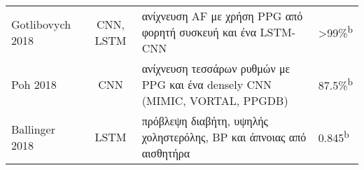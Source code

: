 \begin{sidewaystable}
\begin{tabular}{l c l l}
		Gotlibovych 2018~\cite{gotlibovych2018end}   & CNN, LSTM       & ανίχνευση AF με χρήση PPG από φορητή συσκευή και ένα LSTM-CNN                                                                                                                                                                                                                                                                                           & \textgreater{99\%}\textsuperscript{b}                                                                                                                                                                                                                                                                                                                                                                                                                                                                                 \\
		Poh 2018~\cite{poh2018diagnostic}            & CNN             & ανίχνευση τεσσάρων ρυθμών με PPG και ένα densely CNN (MIMIC, VORTAL, PPGDB)                                                                                                                                                                                                                                                                             & 87.5\%\textsuperscript{b}                                                                                                                                                                                                                                                                                                                                                                                                                                                                                             \\
		Ballinger 2018~\cite{ballinger2018deepheart} & LSTM            & πρόβλεψη διαβήτη, υψηλής χοληστερόλης, BP και άπνοιας από αισθητήρα                                                                                                                                                                                                                                                     & 0.845\textsuperscript{b}                                                                                                                                                                                                                                                                                                                                                                                                                                                                                                         \\
		\bottomrule
	\end{tabular}
\end{sidewaystable}

\clearpage


